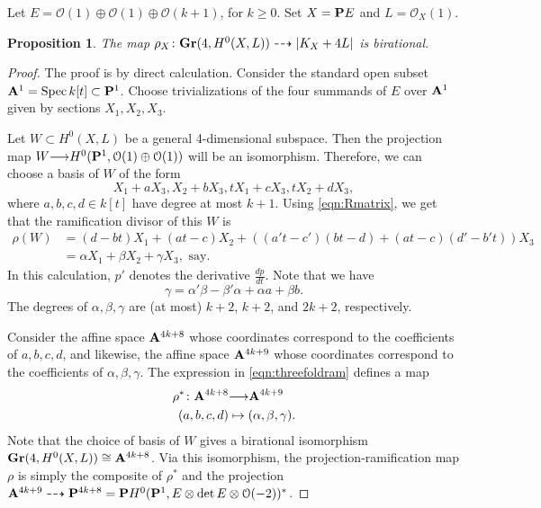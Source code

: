 \documentclass[11pt,reqno]{amsart}
\theoremstyle{plain}
\newtheorem{proposition}[theorem]{Proposition}
\theoremstyle{definition}
\theoremstyle{remark}
\numberwithin{equation}{section}
\renewcommand{\k}{k}
\renewcommand{\to}{{\longrightarrow}}
\numberwithin{equation}{section}
\renewcommand{\O}{\mathcal O}
\begin{document}
Let $E = \O(1) \oplus \O(1) \oplus \O(k+1)$, for $k \geq 0$.
Set $X = \P E$ and $L = \O_X(1)$.
\begin{proposition}\label{prop:eccentric_threefold}
  The map $\rho_X \from \Gr(4, H^0(X, L)) \dashrightarrow |K_X + 4L|$ is birational.
\end{proposition}
\begin{proof}
  The proof is by direct calculation.
  Consider the standard open subset $\A^1 = \spec \k[t] \subset \P^1$.
  Choose trivializations of the four summands of $E$ over $\A^1$ given by sections $X_1, X_2, X_3$.
  
  Let $W \subset H^0(X, L)$ be a general 4-dimensional subspace.
  Then the projection map $W \to H^0(\P^1, \O(1) \oplus \O(1))$ will be an isomorphism.
  Therefore, we can choose a basis of $W$ of the form
  \[
    X_1 + aX_3, X_2 + bX_3, tX_1 + cX_3, tX_2 + d X_3,
  \]
  where $a, b, c, d \in \k[t]$ have degree at most $k+1$.
  Using \eqref{eqn:Rmatrix}, we get that the ramification divisor of this $W$ is
  \begin{equation}\label{eqn:threefoldram}
    \begin{split}
    \rho(W) &= (d-bt)X_1 + (at-c)X_2 + \left((a't-c')(bt-d) + (at-c)(d'-b't) \right) X_3 \\
    &= \alpha X_1 + \beta X_2 + \gamma X_3, \text{ say}.
  \end{split}
\end{equation}
  In this calculation, $p'$ denotes the derivative $\frac{dp}{dt}$.
  Note that we have
  \[ \gamma = \alpha'\beta - \beta'\alpha + \alpha a + \beta b.\]
  The degrees of $\alpha, \beta, \gamma$ are (at most) $k+2$, $k+2$, and $2k+2$, respectively.

  Consider the affine space $\A^{4k+8}$ whose coordinates correspond to the coefficients of $a, b, c, d$, and likewise, the affine space $\A^{4k+9}$ whose coordinates correspond to the coefficients of $\alpha, \beta, \gamma$.
  The expression in \eqref{eqn:threefoldram} defines a map
  \begin{align*}
    \rho^* \from \A^{4k+8} &\to \A^{4k+9} \\
    (a,b,c,d) &\mapsto (\alpha, \beta, \gamma).
  \end{align*}
  Note that the choice of basis of $W$ gives a birational isomorphism $\Gr(4, H^0(X, L)) \cong \A^{4k+8}$.
  Via this isomorphism, the projection-ramification map $\rho$ is simply the composite of $\rho^*$ and the projection $\A^{4k+9} \dashrightarrow \P^{4k+8} = \P H^0(\P^1, E \otimes \det E \otimes \O(-2))^*$.


\end{proof}
\end{document}

